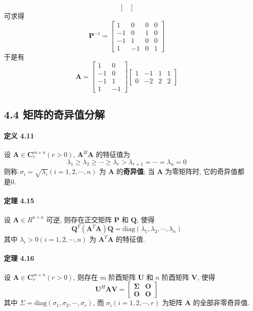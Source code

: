 \documentclass[12pt, a4paper, oneside, fontset=none]{ctexart}
\begin{document}
\begin{enumerate}
$$\begin{bmatrix}
            \end{bmatrix}
        $$
        可求得
        $$
            \bm{P}^{-1} = \begin{bmatrix}
                1  & 0  & 0 & 0 \\
                -1 & 0  & 1 & 0 \\
                -1 & 1  & 0 & 0 \\
                1  & -1 & 0 & 1
            \end{bmatrix}
        $$
        于是有
        $$
            \bm{A} = \begin{bmatrix}
                1  & 0  \\
                -1 & 0  \\
                -1 & 1  \\
                1  & -1
            \end{bmatrix} \begin{bmatrix}
                1 & -1 & 1 & 1 \\
                0 & -2 & 2 & 2
            \end{bmatrix}
        $$
\end{enumerate}

\subsection*{4.4 \quad 矩阵的奇异值分解}

\paragraph*{定义 4.11} 设 $\bm{A} \in \bm{C}^{m\times n}_r(r > 0)$, $\bm{A}^{H}\bm{A}$ 的特征值为
$$
    \lambda_1 \geqslant \lambda_2 \geqslant \cdots \geqslant \lambda_r > \lambda_{r + 1} = \cdots = \lambda_n = 0
$$
则称 $\sigma_i = \sqrt{\lambda_i} (i = 1,2, \cdots, n)$ 为 $\bm{A}$ 的\textbf{奇异值}; 当 $\bm{A}$ 为零矩阵时, 它的奇异值都是0.

\paragraph*{定理 4.15} 设 $\bm{A} \in R^{n\times n}$ 可逆, 则存在正交矩阵 $\bm{P}$ 和 $\bm{Q}$, 使得
$$
    \bm{Q}^T(\bm{A}^T\bm{A})\bm{Q} = \mathrm{diag}(\lambda_1,\lambda_2,\cdots,\lambda_n)
$$
其中 $\lambda_i > 0 (i = 1, 2, \cdots, n)$ 为 $\bm{A}^T\bm{A}$ 的特征值.

\paragraph*{定理 4.16} 设 $\bm{A} \in \bm{C}^{m\times n}_r(r > 0)$, 则存在 $m$ 阶酉矩阵 $\bm{U}$ 和 $n$ 阶酉矩阵 $\bm{V}$, 使得
$$
    \bm{U}^H\bm{AV} = \begin{bmatrix}
        \bm{\Sigma} & \bm{O} \\
        \bm{O}      & \bm{O}
    \end{bmatrix}
$$
其中 $\Sigma = \mathrm{diag}(\sigma_1, \sigma_2, \cdots, \sigma_r)$, 而 $\sigma_i(i = 1,2,\cdots,r)$ 为矩阵 $\bm{A}$ 的全部非零奇异值.
\end{document}
